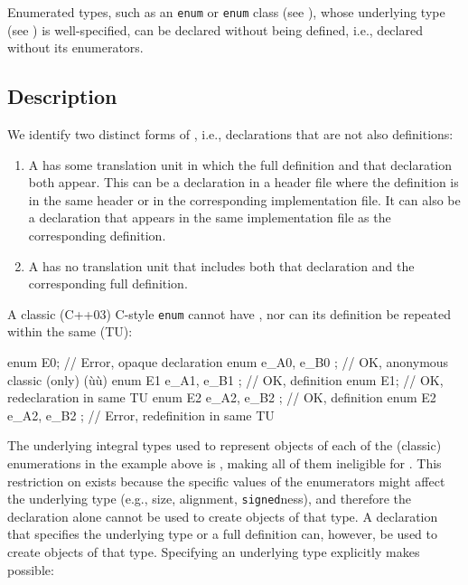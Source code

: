 

Enumerated types, such as an \lstinline!enum! or \lstinline!enum! class (see ), whose underlying type (see ) is well-specified, can be
declared without being defined, i.e., declared without its enumerators.

\subsection[Description]{Description}\label{description}

We identify two distinct forms of , i.e.,
declarations that are not also definitions:
\begin{enumerate}
\item{A  has some translation unit in which the full definition and that declaration both appear. This can be a declaration in a header file where the definition is in the same header or in the corresponding implementation file. It can also be a declaration that appears in the same implementation file as the corresponding definition.}
\item{A  has no translation unit that includes both that declaration and the corresponding full definition.}
\end{enumerate}

A classic (C++03) C-style \lstinline!enum! cannot have , nor can its definition be repeated within the same
 (TU):

\begin{emcppslisting}
enum E0;                 // Error, opaque declaration
enum    { e_A0, e_B0 };  // OK, anonymous classic (only) (ù{}ù)
enum E1 { e_A1, e_B1 };  // OK, definition
enum E1;                 // OK, redeclaration in same TU
enum E2 { e_A2, e_B2 };  // OK, definition
enum E2 { e_A2, e_B2 };  // Error, redefinition in same TU
\end{emcppslisting}

\noindent The underlying integral types used to represent objects of each of the
(classic) enumerations in the example above is , making
all of them ineligible for . This restriction
on  exists because the specific values of
the enumerators might affect the underlying type %
(e.g.,
size, alignment, \lstinline!signed!ness), and therefore the declaration
alone cannot be used to create objects of that type. A declaration that
specifies the underlying type or a full definition can, however, be used
to create objects of that type. Specifying an underlying
type %
explicitly makes  possible:

